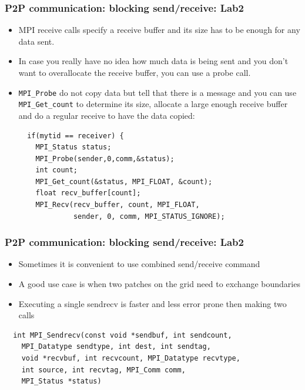 \documentclass{beamer}
\begin{document}
\begin{frame}[fragile]
  \frametitle{P2P communication: blocking send/receive: Lab2}
\begin{itemize}
\item MPI receive calls specify a receive buffer and its size has to be enough for any data sent.
\item In case you really have no idea how much data is being sent and you don't want to overallocate the receive buffer, you can use a probe call.
\item {\color{mycolorcode}\verb|MPI_Probe|} do not copy data but tell that there is a message and you can use {\color{mycolorcode}\verb|MPI_Get_count|} 
to determine its size, allocate a large enough receive buffer and do a regular receive to have the data copied:
{\color{mycolorcode}
\begin{verbatim}
  if(mytid == receiver) {
    MPI_Status status;
    MPI_Probe(sender,0,comm,&status);
    int count;
    MPI_Get_count(&status, MPI_FLOAT, &count);
    float recv_buffer[count];
    MPI_Recv(recv_buffer, count, MPI_FLOAT, 
             sender, 0, comm, MPI_STATUS_IGNORE);
\end{verbatim}
}
\end{itemize}
\end{frame}


\begin{frame}[fragile]
  \frametitle{P2P communication: blocking send/receive: Lab2}
\begin{itemize}
\item Sometimes it is convenient to use combined send/receive command
\item A good use case is when two patches on the grid need to exchange boundaries
\item Executing a single sendrecv is faster and less error prone then making two calls
\end{itemize}
{\color{mycolorcode}
\begin{verbatim}
  int MPI_Sendrecv(const void *sendbuf, int sendcount, 
    MPI_Datatype sendtype, int dest, int sendtag, 
    void *recvbuf, int recvcount, MPI_Datatype recvtype, 
    int source, int recvtag, MPI_Comm comm, 
    MPI_Status *status)
\end{verbatim}
}
\end{frame}
\end{document}
